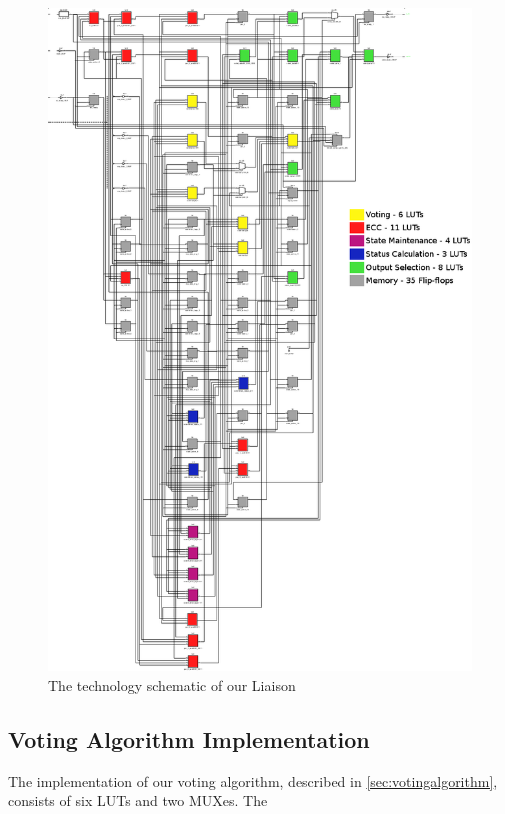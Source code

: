 \begin{figure}[p]
  \vspace*{-1.2in}
  \centerline{ \includegraphics[width=1.2\textwidth]{LUT-count} }
  \caption{The technology schematic of our Liaison}
  \label{fig:technologyschematic}
\end{figure}

\subsection{Voting Algorithm Implementation}
The implementation of our voting algorithm, described in
\autoref{sec:votingalgorithm}, consists of six LUTs and two MUXes. The 


